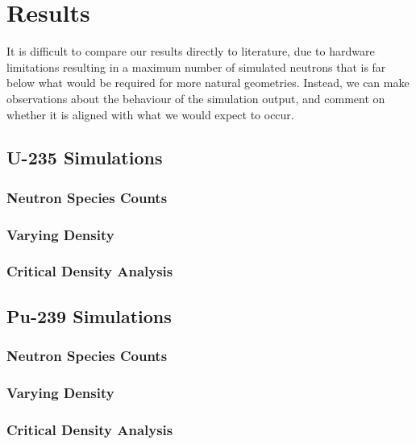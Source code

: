 \section{Results}

It is difficult to compare our results directly to literature, due to hardware limitations resulting in a maximum number of 
simulated neutrons that is far below what would be required for more natural geometries. Instead, we can make observations 
about the behaviour of the simulation output, and comment on whether it is aligned with what we would expect to occur.

\subsection{U-235 Simulations}

\subsubsection{Neutron Species Counts}

\subsubsection{Varying Density}

\subsubsection{Critical Density Analysis}

\subsection{Pu-239 Simulations}

\subsubsection{Neutron Species Counts}

\subsubsection{Varying Density}

\subsubsection{Critical Density Analysis}

